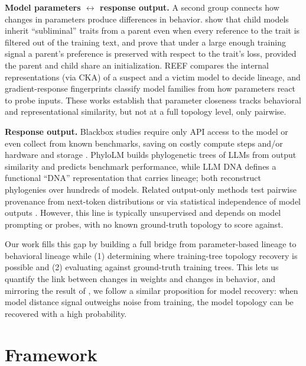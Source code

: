 \documentclass{article}
\theoremstyle{definition}
\theoremstyle{plain}
\begin{document}
\textbf{Model parameters $\leftrightarrow$ response output.} A second group connects how changes in parameters produce differences in behavior. \citet{cloud2025subliminal} show that child models inherit
``subliminal'' traits from a parent even when every reference to the trait is filtered out of the training text, and prove that under a large enough training signal a parent's preference is preserved with respect to the trait's loss, provided the parent and child share an initialization. REEF \citep{zhang2025reef} compares the internal representations (via CKA) of a suspect and a victim model to decide lineage, and gradient-response fingerprints \citep{tensorguard2025} classify model families from how parameters react to probe inputs. These works establish that parameter closeness tracks behavioral and
representational similarity, but not at a full topology level, only pairwise.

\textbf{Response output.} Blackbox studies require only API access to the model or even collect from known benchmarks, saving on costly compute steps and/or hardware and storage \citep{yax2025phylolm, wu2026llmdna}. PhyloLM
\citep{yax2025phylolm} builds phylogenetic trees of LLMs from output similarity and predicts benchmark
performance, while LLM DNA \citep{wu2026llmdna} defines a functional ``DNA'' representation that carries
lineage; both reconstruct phylogenies over hundreds of models. Related output-only methods test
pairwise provenance from next-token distributions \citep{nikolic2026model} or via statistical
independence of model outputs \citep{zhu2025independence}. However, this line is typically unsupervised
and depends on model prompting or probes, with no known ground-truth topology to score against.

Our work fills this gap by building a full bridge from parameter-based lineage to behavioral lineage
while (1) determining where training-tree topology recovery is possible and (2) evaluating against ground-truth
training trees. This lets us quantify the link between changes in weights and changes in behavior,
and mirroring the result of \citet{cloud2025subliminal}, we follow a similar proposition for model recovery: when model distance signal outweighs noise from training, the model topology can be recovered with a high probability.





\section{Framework}
\label{sec:framework}
\end{document}
